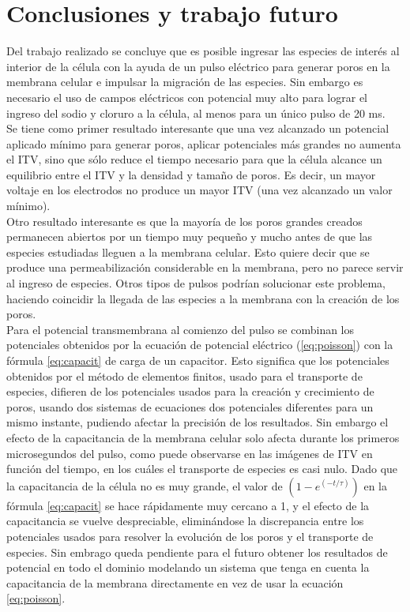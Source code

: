 \documentclass[11pt,a4paper,twoside]{tesis}
\begin{document}
\newpage\clearpage
\section{Conclusiones y trabajo futuro}

Del trabajo realizado se concluye que es posible ingresar las especies de interés al interior de la célula con la ayuda de un pulso eléctrico para generar poros en la membrana celular e impulsar la migración de las especies. Sin embargo es necesario el uso de campos eléctricos con potencial muy alto para lograr el ingreso del sodio y cloruro a la célula, al menos para un único pulso de 20 ms. \\

Se tiene como primer resultado interesante que una vez alcanzado un potencial aplicado mínimo para generar poros, aplicar potenciales más grandes no aumenta el ITV, sino que sólo reduce el tiempo necesario para que la célula alcance un equilibrio entre el ITV y la densidad y tamaño de poros. Es decir, un mayor voltaje en los electrodos no produce un mayor ITV (una vez alcanzado un valor mínimo).\\

Otro resultado interesante es que la mayoría de los poros grandes creados permanecen abiertos por un tiempo muy pequeño y mucho antes de que las especies estudiadas lleguen a la membrana celular. Esto quiere decir que se produce una permeabilización considerable en la membrana, pero no parece servir al ingreso de especies. Otros tipos de pulsos podrían solucionar este problema, haciendo coincidir la llegada de las especies a la membrana con la creación de los poros.\\

Para el potencial transmembrana al comienzo del pulso se combinan los potenciales obtenidos por la ecuación de potencial eléctrico (\ref{eq:poisson}) con la fórmula \ref{eq:capacit} de carga de un capacitor. Esto significa que los potenciales obtenidos por el método de elementos finitos, usado para el transporte de especies, difieren de los potenciales usados para la creación y crecimiento de poros, usando dos sistemas de ecuaciones dos potenciales diferentes para un mismo instante, pudiendo afectar la precisión de los resultados. Sin embargo el efecto de la capacitancia de la membrana celular solo afecta durante los primeros microsegundos del pulso, como puede observarse en las imágenes de ITV en función del tiempo, en los cuáles el transporte de especies es casi nulo. Dado que la capacitancia de la célula no es muy grande, el valor de $(1 - e^{(-t/\tau)})$ en la fórmula \ref{eq:capacit} se hace rápidamente muy cercano a 1, y el efecto de la capacitancia se vuelve despreciable, eliminándose la discrepancia entre los potenciales usados para resolver la evolución de los poros y el transporte de especies. Sin embrago queda pendiente para el futuro obtener los resultados de potencial en todo el dominio modelando un sistema que tenga en cuenta la capacitancia de la membrana directamente en vez de usar la ecuación \ref{eq:poisson}.\\
\end{document}
